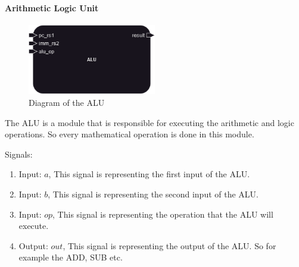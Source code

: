 \paragraph{Arithmetic Logic Unit}

\begin{figure}[H]
    \centering
    \includegraphics[width=0.5\textwidth]{design/pipelined/execute/images/alu.png}
    \caption{Diagram of the ALU}
    \label{fig:alu}
\end{figure}

The ALU is a module that is responsible for executing the arithmetic and logic operations. So every mathematical operation is done in this module.

Signals:
\begin{enumerate}[label={\textbullet}]
    \item Input: $a$, This signal is representing the first input of the ALU.
    \item Input: $b$, This signal is representing the second input of the ALU.
    \item Input: $op$, This signal is representing the operation that the ALU will execute.
    \item Output: $out$, This signal is representing the output of the ALU. So for example the 
    ADD, SUB etc.
\end{enumerate}